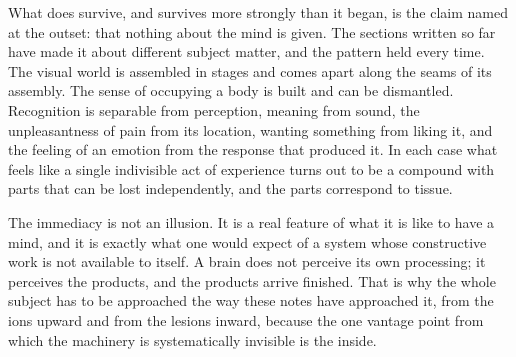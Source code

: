 \documentclass[11pt]{article}
\begin{document}
What does survive, and survives more strongly than it began, is the claim named at the outset: that nothing about the mind is given. The sections written so far have made it about different subject matter, and the pattern held every time. The visual world is assembled in stages and comes apart along the seams of its assembly. The sense of occupying a body is built and can be dismantled. Recognition is separable from perception, meaning from sound, the unpleasantness of pain from its location, wanting something from liking it, and the feeling of an emotion from the response that produced it. In each case what feels like a single indivisible act of experience turns out to be a compound with parts that can be lost independently, and the parts correspond to tissue.

The immediacy is not an illusion. It is a real feature of what it is like to have a mind, and it is exactly what one would expect of a system whose constructive work is not available to itself. A brain does not perceive its own processing; it perceives the products, and the products arrive finished. That is why the whole subject has to be approached the way these notes have approached it, from the ions upward and from the lesions inward, because the one vantage point from which the machinery is systematically invisible is the inside.
\end{document}
